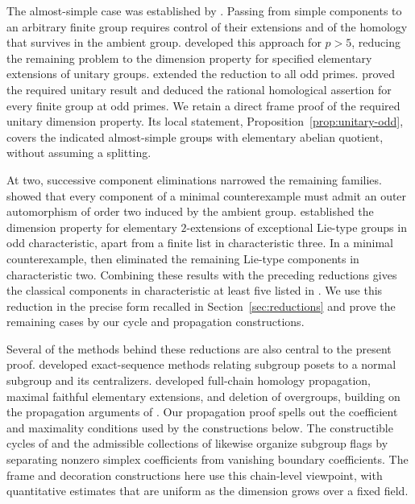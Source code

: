 The almost-simple case was established by
\citet{AschbacherKleidman1990}. Passing from simple components to an
arbitrary finite group requires control of their extensions and of the
homology that survives in the ambient group.
\citet{AschbacherSmith1993} developed this approach for $p>5$, reducing
the remaining problem to the dimension property for specified
elementary extensions of unitary groups.
\citet[Theorems~1.1 and~1.4]{PitermanSmith2025} extended the reduction
to all odd primes. \citet[Theorems~B and~C]{DiazRamos2026} proved the
required unitary result and deduced the rational homological assertion
for every finite group at odd primes. We retain a direct frame proof
of the required unitary dimension property. Its local statement,
Proposition~\ref{prop:unitary-odd}, covers the indicated almost-simple
groups with elementary abelian quotient, without assuming a splitting.

At two, successive component eliminations narrowed the remaining
families. \citet[Corollary~1.3]{PitermanSmith2022} showed that every
component of a minimal counterexample must admit an outer automorphism
of order two induced by the ambient group.
\citet[Theorem~1.1 and Corollary~1.2]{Piterman2024} established the
dimension property for elementary $2$-extensions of exceptional
Lie-type groups in odd characteristic, apart from a finite list in
characteristic three. In a minimal counterexample,
\citet[Theorem~A]{Piterman2026} then eliminated the remaining Lie-type
components in characteristic two. Combining these results with the
preceding reductions gives the classical components in characteristic
at least five listed in \citet[Theorem~B]{Piterman2026}.
We use this reduction in the precise form recalled in
Section~\ref{sec:reductions} and prove the remaining cases by our cycle
and propagation constructions.

Several of the methods behind these reductions are also central to the
present proof. \citet{SegevWebb1994} developed exact-sequence methods
relating subgroup posets to a normal subgroup and its centralizers.
\citet[Sections~3--5]{Piterman2021} developed full-chain homology
propagation, maximal faithful elementary extensions, and deletion of
overgroups, building on the propagation arguments of
\citet{AschbacherSmith1993}. Our propagation proof spells out the
coefficient and maximality conditions used by the constructions below.
The constructible cycles of \citet{DiazRamos2018} and the admissible
collections of \citet{DiazRamosMazza2022} likewise organize subgroup
flags by separating nonzero simplex coefficients from vanishing
boundary coefficients. The frame and decoration constructions here
use this chain-level viewpoint, with quantitative estimates that are
uniform as the dimension grows over a fixed field.

